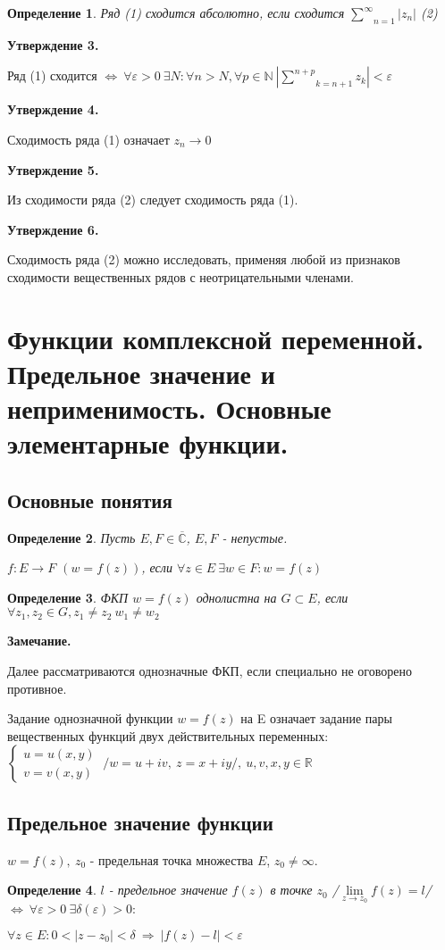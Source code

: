 \documentclass[draft]{report}
\newcommand{\then}{\ \Rightarrow\ }
\newcommand{\R}{\mathbb{R}}
\renewcommand{\C}{\mathbb{C}}
\newcommand{\N}{\mathbb{N}}
\newcommand{\ind}[3]{\underset{#1}{\overset{#2}{#3}}}
\newcommand{\mlim}[1]{\underset{#1}{\lim}}
\newcommand{\LRA}{\Leftrightarrow}
\renewcommand{\bar}{\overline}
\newcommand{\e}{\varepsilon}
\newcommand{\rd}{\underset{n=1}{\overset{\infty}{\sum}}}
\newcommand{\CC}{\bar{\C}}
\newcommand{\sys}[1]{\left\{\begin{matrix}#1\end{matrix}\right.}
\newcommand{\opr}[1]{\begin{opred}#1\end{opred}}
\newtheorem*{opred}{Определение}
\theoremstyle{remark}
\begin{document}
\opr{Ряд (1) сходится абсолютно, если сходится $\rd |z_n|$ (2)}

{\bfseries Утверждение 3.}

Ряд (1) сходится $\LRA\ \forall\e>0\ \exists N\colon\forall n>N,\forall p\in\N\ \left|\ind{k=n+1}{n+p}{\sum}z_k\right|<\e$

{\bfseries Утверждение 4.}

Сходимость ряда (1) означает $z_n\to 0$

{\bfseries Утверждение 5.}

Из сходимости ряда (2) следует сходимость ряда (1).

{\bfseries Утверждение 6.}

Сходимость ряда (2) можно исследовать, применяя любой из признаков сходимости вещественных рядов с неотрицательными членами.

\section{Функции комплексной переменной. Предельное значение и неприменимость. Основные элементарные функции.}

\subsection{Основные понятия}

\opr{Пусть $E,F\in\CC$, $E,F$ - непустые.

$f\colon E\to F$ $(w=f(z))$, если $\forall z\in E\ \exists w\in F\colon w=f(z)$}

\opr{ФКП $w=f(z)$ однолистна на $G\subset E$, если $\forall z_1,z_2\in G,z_1\neq z_2\ w_1\neq w_2$}

{\bfseries Замечание.}

Далее рассматриваются однозначные ФКП, если специально не оговорено противное.

Задание однозначной функции $w=f(z)$ на E означает задание пары вещественных функций двух действительных переменных: $\sys{u=u(x,y)\\v=v(x,y)}\ /w=u+iv,\ z=x+iy/,\ u,v,x,y\in\R$

\subsection{Предельное значение функции}

$w=f(z),\ z_0$ - предельная точка множества $E$, $z_0\neq\infty$.

\opr{$l$ - предельное значение $f(z)$ в точке $z_0$ /$\mlim{z\to z_0}f(z)=l$/ $\LRA\ \forall\e>0\ \exists\delta(\e)>0\colon$

$\forall z\in E\colon 0<|z-z_0|<\delta \then |f(z)-l|<\e$}
\end{document}
